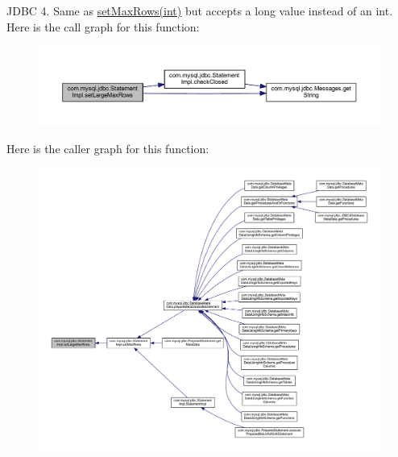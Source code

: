 J\+D\+BC 4. Same as \mbox{\hyperlink{classcom_1_1mysql_1_1jdbc_1_1_statement_impl_a06eb1d241e4ca066606cbf1a1e04e87c}{set\+Max\+Rows(int)}} but accepts a long value instead of an int. Here is the call graph for this function\+:
\nopagebreak
\begin{figure}[H]
\begin{center}
\leavevmode
\includegraphics[width=350pt]{classcom_1_1mysql_1_1jdbc_1_1_statement_impl_a273589250c52af54dac911d1cfcfd87d_cgraph}
\end{center}
\end{figure}
Here is the caller graph for this function\+:
\nopagebreak
\begin{figure}[H]
\begin{center}
\leavevmode
\includegraphics[width=350pt]{classcom_1_1mysql_1_1jdbc_1_1_statement_impl_a273589250c52af54dac911d1cfcfd87d_icgraph}
\end{center}
\end{figure}
\mbox{\label{classcom_1_1mysql_1_1jdbc_1_1_statement_impl_ae2d3d7d72cfa5be301a49828f8bfa126}} 
